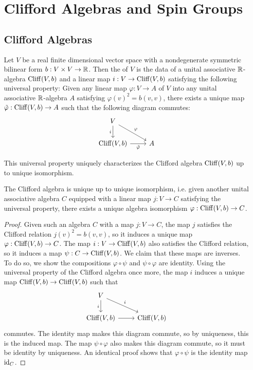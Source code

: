 
\chapter{Clifford Algebras and Spin Groups}
%
\subsectionend
\iffalse
$ $\\
\emph{No one fully understands spinors. Their algebra is formally understood,
but their geometrical significance is mysterious. In some sense they describe
the ``square root" of geometry and, just as understanding the concept of
$\sqrt{-1}$ took centuries, the same might be true of spinors.} \\
%
\ib{-- ~ Sir Michael Atiyah}
\subsectionend
\fi
%
\section{Clifford Algebras}
%
\begin{defn}
Let $V$ be a real finite dimensional vector space with a nondegenerate
symmetric bilinear form $b : V \times V \to \mathbb{R}$. Then the 
of $V$ is the data of a unital associative $\mathbb{R}$-algebra $\operatorname{Cliff}(V,b)$ and a linear
map $i : V \to \operatorname{Cliff}(V,b)$ satisfying the following universal property:
Given any linear map $\varphi : V \to A$ of $V$ into any unital associative
$\mathbb{R}$-algebra $A$ satisfying $\varphi(v)^2 = b(v,v)$, there exists a unique map
$\tilde{\varphi}: \operatorname{Cliff}(V,b) \to A$ such that the following diagram commutes:
%
\[\begin{tikzcd}
V \ar[dr, "\varphi"] \ar[d, "i"'] \\
\Cliff(V,b) \ar[r, "\tilde{\varphi}"'] & A
\end{tikzcd}\]
\end{defn}
%
This universal property uniquely characterizes the Clifford algebra $\operatorname{Cliff}(V,b)$
up to unique isomorphism.
%
\begin{thm}
The Clifford algebra is unique up to unique isomorphism, i.e. given
another unital associative algebra $C$ equipped with a linear map $j : V \to C$
satisfying the universal property, there exists a unique algebra isomorphism
$\varphi : \operatorname{Cliff}(V,b) \to C$.
\end{thm}
%
\begin{proof}
Given such an algebra $C$ with a map $j: V \to C$, the map $j$
satisfies the Clifford relation $j(v)^2 = b(v,v)$, so it induces a unique map
$\varphi : \operatorname{Cliff}(V,b) \to C$. The map $i : V \to \operatorname{Cliff}(V,b)$ also
satisfies the Clifford relation, so it induces a map $\psi : C \to \operatorname{Cliff}(V,b)$.
We claim that these maps are inverses. To do so, we show the compositions
$\varphi \circ \psi$ and $\psi \circ \varphi$ are identity. Using the
universal property of the Clifford algebra once more, the map $i$ induces
a unique map $\operatorname{Cliff}(V,b) \to \operatorname{Cliff}(V,b)$ such that
\[\begin{tikzcd}
V \ar[dr, "i"] \ar[d, "i"'] \\
\Cliff(V,b) \ar[r] & \Cliff(V,b)
\end{tikzcd}\]
commutes. The identity map makes this diagram commute, so by uniqueness, this is
the induced map. The map $\psi \circ \varphi$ also makes this diagram commute,
so it must be identity by uniqueness. An identical proof shows that
$\varphi \circ \psi$ is the identity map $\operatorname{id}_C$.
\end{proof}
